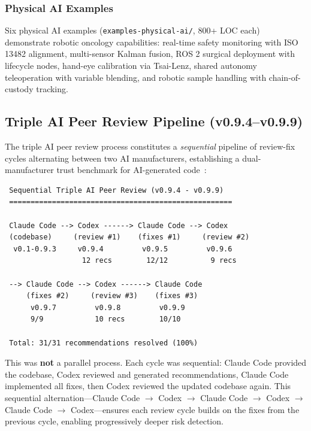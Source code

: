 
\subsubsection{Physical AI Examples}

Six physical AI examples (\texttt{examples-physical-ai/}, 800+ LOC each) demonstrate robotic oncology capabilities: real-time safety monitoring with ISO 13482 alignment, multi-sensor Kalman fusion, ROS 2 surgical deployment with lifecycle nodes, hand-eye calibration via Tsai-Lenz, shared autonomy teleoperation with variable blending, and robotic sample handling with chain-of-custody tracking.

\subsection{Triple AI Peer Review Pipeline (v0.9.4--v0.9.9)}
\label{sec:peerreview}

The triple AI peer review process constitutes a \emph{sequential} pipeline of review-fix cycles alternating between two AI manufacturers, establishing a dual-manufacturer trust benchmark for AI-generated code~\cite{kawchak2026peerreview}:

\begin{verbatim}
 Sequential Triple AI Peer Review (v0.9.4 - v0.9.9)
 ====================================================

 Claude Code --> Codex ------> Claude Code --> Codex
 (codebase)     (review #1)    (fixes #1)     (review #2)
  v0.1-0.9.3     v0.9.4         v0.9.5         v0.9.6
                  12 recs        12/12          9 recs

 --> Claude Code --> Codex ------> Claude Code
     (fixes #2)     (review #3)    (fixes #3)
      v0.9.7         v0.9.8         v0.9.9
      9/9            10 recs        10/10

 Total: 31/31 recommendations resolved (100%)
\end{verbatim}

This was \textbf{not} a parallel process. Each cycle was sequential: Claude Code provided the codebase, Codex reviewed and generated recommendations, Claude Code implemented all fixes, then Codex reviewed the updated codebase again. This sequential alternation---Claude Code $\to$ Codex $\to$ Claude Code $\to$ Codex $\to$ Claude Code $\to$ Codex---ensures each review cycle builds on the fixes from the previous cycle, enabling progressively deeper risk detection.

